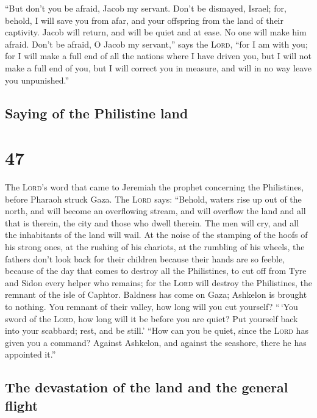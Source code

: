  ``But don't you be afraid, Jacob my servant. Don't be
dismayed, Israel; for, behold, I will save you from afar, and your
offspring from the land of their captivity. Jacob will return, and will
be quiet and at ease. No one will make him afraid.  Don't
be afraid, O Jacob my servant,'' says the \textsc{Lord}, ``for I am with
you; for I will make a full end of all the nations where I have driven
you, but I will not make a full end of you, but I will correct you in
measure, and will in no way leave you unpunished.''

\hypertarget{saying-of-the-philistine-land}{%
\subsection{Saying of the Philistine
land}\label{saying-of-the-philistine-land}}

\hypertarget{section-46}{%
\section{47}\label{section-46}}

 The \textsc{Lord}'s word that came to Jeremiah the
prophet concerning the Philistines, before Pharaoh struck Gaza.
 The \textsc{Lord} says: ``Behold, waters rise up out of
the north, and will become an overflowing stream, and will overflow the
land and all that is therein, the city and those who dwell therein. The
men will cry, and all the inhabitants of the land will wail.
 At the noise of the stamping of the hoofs of his strong
ones, at the rushing of his chariots, at the rumbling of his wheels, the
fathers don't look back for their children because their hands are so
feeble,  because of the day that comes to destroy all the
Philistines, to cut off from Tyre and Sidon every helper who remains;
for the \textsc{Lord} will destroy the Philistines, the remnant of the
isle of Caphtor.  Baldness has come on Gaza; Ashkelon is
brought to nothing. You remnant of their valley, how long will you cut
yourself?  ``\,`You sword of the \textsc{Lord}, how long
will it be before you are quiet? Put yourself back into your scabbard;
rest, and be still.'  ``How can you be quiet, since the
\textsc{Lord} has given you a command? Against Ashkelon, and against the
seashore, there he has appointed it.''

\hypertarget{the-devastation-of-the-land-and-the-general-flight}{%
\subsection{The devastation of the land and the general
flight}\label{the-devastation-of-the-land-and-the-general-flight}}

